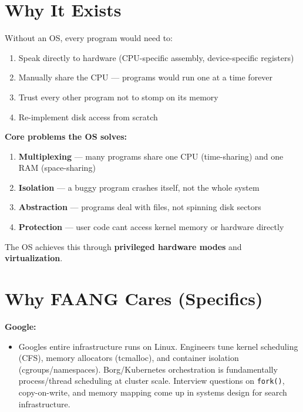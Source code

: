 \documentclass[11pt]{article}
\providecommand{\tightlist}{\setlength{\itemsep}{1pt}\setlength{\parskip}{0pt}}
\begin{document}
\section{Why It Exists}\label{why-it-exists}

Without an OS, every program would need to:

\begin{enumerate}
\def\labelenumi{\arabic{enumi}.}
\tightlist
\item
  Speak directly to hardware (CPU-specific assembly, device-specific registers)
\item
  Manually share the CPU --- programs would run one at a time forever
\item
  Trust every other program not to stomp on its memory
\item
  Re-implement disk access from scratch
\end{enumerate}

\textbf{Core problems the OS solves:}

\begin{enumerate}
\def\labelenumi{\arabic{enumi}.}
\tightlist
\item
  \textbf{Multiplexing} --- many programs share one CPU (time-sharing) and one RAM (space-sharing)
\item
  \textbf{Isolation} --- a buggy program crashes itself, not the whole system
\item
  \textbf{Abstraction} --- programs deal with files, not spinning disk sectors
\item
  \textbf{Protection} --- user code can\textquotesingle t access kernel memory or hardware directly
\end{enumerate}

The OS achieves this through \textbf{privileged hardware modes} and \textbf{virtualization}.

\section{Why FAANG Cares (Specifics)}\label{why-faang-cares-specifics}

\textbf{Google:}

\begin{itemize}
\tightlist
\item
  Google\textquotesingle s entire infrastructure runs on Linux. Engineers tune kernel scheduling (CFS), memory allocators (tcmalloc), and container isolation (cgroups/namespaces). Borg/Kubernetes orchestration is fundamentally process/thread scheduling at cluster scale. Interview questions on \texttt{fork()}, copy-on-write, and memory mapping come up in systems design for search infrastructure.
\end{itemize}
\end{document}
